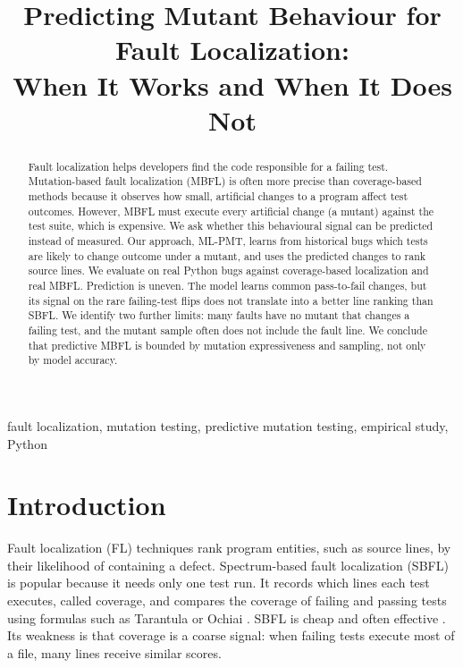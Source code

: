 \documentclass[10pt,conference]{IEEEtran}
\begin{document}
\title{Predicting Mutant Behaviour for Fault Localization:\\
When It Works and When It Does Not}

\author{}

\maketitle

\begin{abstract}
Fault localization helps developers find the code responsible for a failing test. Mutation-based fault localization (MBFL) is often more precise than coverage-based methods because it observes how small, artificial changes to a program affect test outcomes. However, MBFL must execute every artificial change (a mutant) against the test suite, which is expensive. We ask whether this behavioural signal can be predicted instead of measured. Our approach, ML-PMT, learns from historical bugs which tests are likely to change outcome under a mutant, and uses the predicted changes to rank source lines. We evaluate on real Python bugs against coverage-based localization and real MBFL. Prediction is uneven. The model learns common pass-to-fail changes, but its signal on the rare failing-test flips does not translate into a better line ranking than SBFL. We identify two further limits: many faults have no mutant that changes a failing test, and the mutant sample often does not include the fault line. We conclude that predictive MBFL is bounded by mutation expressiveness and sampling, not only by model accuracy.
\end{abstract}

\begin{IEEEkeywords}
fault localization, mutation testing, predictive mutation testing, empirical study, Python
\end{IEEEkeywords}

\section{Introduction}

Fault localization (FL) techniques rank program entities, such as source lines, by their likelihood of containing a defect. Spectrum-based fault localization (SBFL) is popular because it needs only one test run. It records which lines each test executes, called coverage, and compares the coverage of failing and passing tests using formulas such as Tarantula \cite{b1} or Ochiai \cite{b2}. SBFL is cheap and often effective \cite{b7}. Its weakness is that coverage is a coarse signal: when failing tests execute most of a file, many lines receive similar scores.
\end{document}
